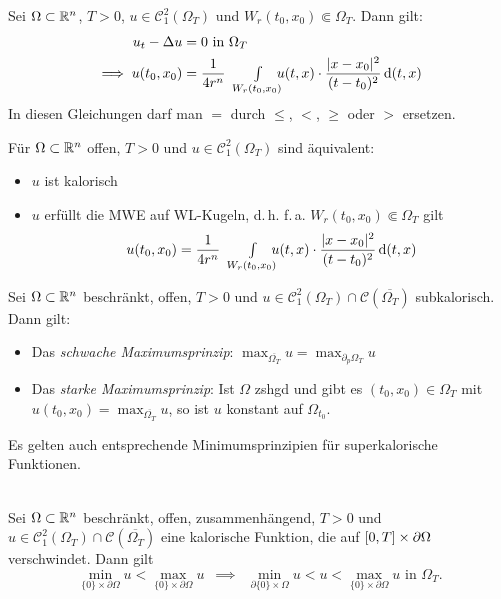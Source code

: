 \documentclass{cheat-sheet}
\begin{document}
\begin{satz}[MWE]
  Sei $\Omega \subset \mathbb{R}^n$, $T > 0$, $u \in \mathcal{C}^2_1(\Omega_T)$ und $W_r(t_0, x_0) \Subset \Omega_T$. Dann gilt:
  \begin{align*}
    u_t - \Delta u &= 0 \text{ in } \Omega_T\\
    \implies u(t_0, x_0) &= \frac{1}{4 r^n} \qquad \Int{\mathclap{W_r(t_0, x_0)}}{}{\quad u(t,x) \cdot \frac{\abs{x-x_0}^2}{(t-t_0)^2}}{(t,x)}
  \end{align*}
  In diesen Gleichungen darf man $=$ durch $\leq$, $<$, $\geq$ oder $>$ ersetzen.
\end{satz}

\begin{kor}
  Für $\Omega \subset \mathbb{R}^n$ offen, $T {>} 0$ und $u \in \mathcal{C}_1^2(\Omega_T)$ sind äquivalent:
  \begin{itemize}
    \item $u$ ist kalorisch
    \item $u$ erfüllt die MWE auf WL-Kugeln, d.\,h. f.\,a. $W_r(t_0, x_0) \Subset \Omega_T$ gilt
    \[
      u(t_0, x_0) = \frac{1}{4 r^n} \qquad \Int{\mathclap{W_r(t_0, x_0)}}{}{\quad u(t,x) \cdot \frac{\abs{x-x_0}^2}{(t-t_0)^2}}{(t,x)}
    \]
  \end{itemize}
\end{kor}

\begin{satz}
  Sei $\Omega \subset \mathbb{R}^n$ beschränkt, offen, $T > 0$ und $u \in \mathcal{C}^2_1(\Omega_T) \cap \mathcal{C}(\overline{\Omega_T})$ subkalorisch. Dann gilt:
  \begin{itemize}
    \item Das \emph{schwache Maximumsprinzip}: $\max_{\overline{\Omega_T}} u = \max_{\partial_p \Omega_T} u$
    \item Das \emph{starke Maximumsprinzip}: Ist $\Omega$ zshgd und gibt es $(t_0, x_0) \in \Omega_T$ mit $u(t_0, x_0) = \max_{\overline{\Omega_T}} u$, so ist $u$ konstant auf $\Omega_{t_0}$.
  \end{itemize}
\end{satz}

\begin{bem}
  Es gelten auch entsprechende Minimumsprinzipien für superkalorische Funktionen.
\end{bem}

\begin{bem}\mbox{}\\
  Sei $\Omega \subset \mathbb{R}^n$ beschränkt, offen, zusammenhängend, $T > 0$ und $u \in \mathcal{C}_1^2(\Omega_T) \cap \mathcal{C}(\overline{\Omega_T})$ eine kalorische Funktion, die auf $\left[ 0, T \right] \times \partial \Omega$ verschwindet. Dann gilt
  \[ \min_{\{ 0 \} \times \partial \Omega} u < \max_{\{ 0 \} \times \partial \Omega} u \enspace\implies\enspace \min_{\partial \{ 0 \} \times \Omega} u < u < \max_{\{ 0 \} \times \partial \Omega} u \text{ in $\Omega_T$}. \]
\end{bem}
\end{document}
